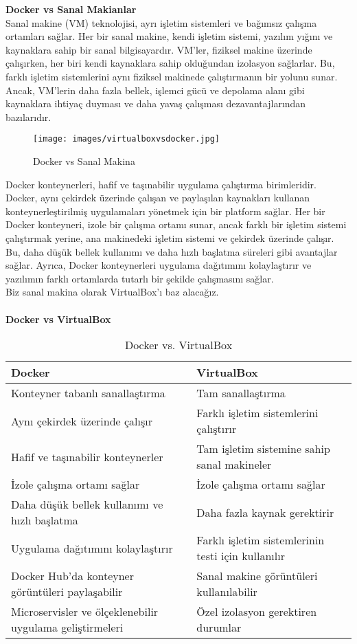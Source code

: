 \textbf{Docker vs Sanal Makianlar} \\
Sanal makine (VM) teknolojisi, ayrı işletim sistemleri ve bağımsız çalışma ortamları sağlar. Her bir sanal makine, kendi işletim sistemi, yazılım yığını ve kaynaklara sahip bir sanal bilgisayardır. VM'ler, fiziksel makine üzerinde çalışırken, her biri kendi kaynaklara sahip olduğundan izolasyon sağlarlar. Bu, farklı işletim sistemlerini aynı fiziksel makinede çalıştırmanın bir yolunu sunar. Ancak, VM'lerin daha fazla bellek, işlemci gücü ve depolama alanı gibi kaynaklara ihtiyaç duyması ve daha yavaş çalışması dezavantajlarından bazılarıdır.\\
\begin{figure}[]
    \centering
    \texttt{[image: images/virtualboxvsdocker.jpg]}
    \caption{Docker vs Sanal Makina}
    \label{fig:resim_etiketi}
  \end{figure}
Docker konteynerleri, hafif ve taşınabilir uygulama çalıştırma birimleridir. Docker, aynı çekirdek üzerinde çalışan ve paylaşılan kaynakları kullanan konteynerleştirilmiş uygulamaları yönetmek için bir platform sağlar. Her bir Docker konteyneri, izole bir çalışma ortamı sunar, ancak farklı bir işletim sistemi çalıştırmak yerine, ana makinedeki işletim sistemi ve çekirdek üzerinde çalışır. Bu, daha düşük bellek kullanımı ve daha hızlı başlatma süreleri gibi avantajlar sağlar. Ayrıca, Docker konteynerleri uygulama dağıtımını kolaylaştırır ve yazılımın farklı ortamlarda tutarlı bir şekilde çalışmasını sağlar.\\
Biz sanal makina olarak VirtualBox'ı baz alacağız.\\
\\\textbf{Docker vs VirtualBox}
\begin{table}[!h]
    \centering
    \begin{tabular}{|p{}|p{}|}
      \hline
      \textbf{Docker} & \textbf{VirtualBox} \\
      \hline
      Konteyner tabanlı sanallaştırma & Tam sanallaştırma \\
      \hline
      Aynı çekirdek üzerinde çalışır & Farklı işletim sistemlerini çalıştırır \\
      \hline
      Hafif ve taşınabilir konteynerler & Tam işletim sistemine sahip sanal makineler \\
      \hline
      İzole çalışma ortamı sağlar & İzole çalışma ortamı sağlar \\
      \hline
      Daha düşük bellek kullanımı ve hızlı başlatma & Daha fazla kaynak gerektirir \\
      \hline
      Uygulama dağıtımını kolaylaştırır & Farklı işletim sistemlerinin testi için kullanılır \\
      \hline
      Docker Hub'da konteyner görüntüleri paylaşabilir & Sanal makine görüntüleri kullanılabilir \\
      \hline
      Microservisler ve ölçeklenebilir uygulama geliştirmeleri & Özel izolasyon gerektiren durumlar \\
      \hline
    \end{tabular}
    \caption{Docker vs. VirtualBox}
  \end{table}
  
